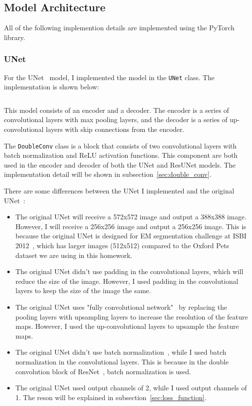 \subsection{Model Architecture}

All of the following implemention details are implemented using the PyTorch~\cite{PyTorch2} library.

\subsubsection{UNet}
\label{sec:unet}

For the UNet~\cite{UNet} model, I implemented the model in the \texttt{UNet} class. The implementation is shown below:

\inputminted[firstline=7]{python}{../src/models/unet.py}

This model consists of an encoder and a decoder. The encoder is a series of convolutional layers with max pooling layers, and the decoder is a series of up-convolutional layers with skip connections from the encoder.

The \texttt{DoubleConv} class is a block that consists of two convolutional layers with batch normalization and ReLU activation functions.
This component are both used in the encoder and decoder of both the UNet and ResUNet models.
The implementation detail will be shown in subsection~\ref{sec:double_conv}.

There are some differences between the UNet I implemented and the original UNet~\cite{UNet}:
\begin{itemize}
    \item The original UNet will receive a 572x572 image and output a 388x388 image. However, I will receive a 256x256 image and output a 256x256 image.
          This is because the original UNet is designed for EM segmentation challenge at ISBI 2012~\cite{ISBI2012EM}, which has larger images (512x512) compared to the Oxford Pets dataset we are using in this homework.
    \item The original UNet didn't use padding in the convolutional layers, which will reduce the size of the image.
          However, I used padding in the convolutional layers to keep the size of the image the same.
    \item The original UNet uses "fully convolutional network"~\cite{FCN} by replacing the pooling layers with upsampling layers to increase the resolution of the feature maps.
          However, I used the up-convolutional layers to upsample the feature maps.
    \item The original UNet didn't use batch normalization~\cite{BN}, while I used batch normalization in the convolutional layers.
          This is because in the double convolution block of ResNet~\cite{ResNet}, batch normalization is used.
    \item The original UNet used output channels of 2, while I used output channels of 1. The reson will be explained in subsection~\ref{sec:loss_function}.
\end{itemize}

